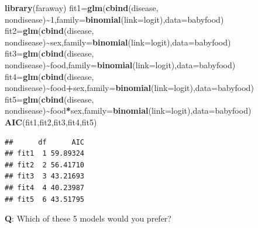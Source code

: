 \documentclass[
  ignorenonframetext,
]{beamer}
\newenvironment{Shaded}{\begin{snugshade}}{\end{snugshade}}
\newcommand{\AttributeTok}[1]{\textcolor[rgb]{0.13,0.29,0.53}{#1}}
\newcommand{\DecValTok}[1]{\textcolor[rgb]{0.00,0.00,0.81}{#1}}
\newcommand{\FunctionTok}[1]{\textcolor[rgb]{0.13,0.29,0.53}{\textbf{#1}}}
\newcommand{\NormalTok}[1]{#1}
\newcommand{\OtherTok}[1]{\textcolor[rgb]{0.56,0.35,0.01}{#1}}
\newcommand{\SpecialCharTok}[1]{\textcolor[rgb]{0.81,0.36,0.00}{\textbf{#1}}}
\begin{document}
\begin{frame}[fragile]
\footnotesize

\begin{Shaded}
\begin{Highlighting}[]
\FunctionTok{library}\NormalTok{(faraway)}
\NormalTok{fit1}\OtherTok{=}\FunctionTok{glm}\NormalTok{(}\FunctionTok{cbind}\NormalTok{(disease, nondisease)}\SpecialCharTok{\textasciitilde{}}\DecValTok{1}\NormalTok{,}\AttributeTok{family=}\FunctionTok{binomial}\NormalTok{(}\AttributeTok{link=}\NormalTok{logit),}\AttributeTok{data=}\NormalTok{babyfood)}
\NormalTok{fit2}\OtherTok{=}\FunctionTok{glm}\NormalTok{(}\FunctionTok{cbind}\NormalTok{(disease, nondisease)}\SpecialCharTok{\textasciitilde{}}\NormalTok{sex,}\AttributeTok{family=}\FunctionTok{binomial}\NormalTok{(}\AttributeTok{link=}\NormalTok{logit),}\AttributeTok{data=}\NormalTok{babyfood)}
\NormalTok{fit3}\OtherTok{=}\FunctionTok{glm}\NormalTok{(}\FunctionTok{cbind}\NormalTok{(disease, nondisease)}\SpecialCharTok{\textasciitilde{}}\NormalTok{food,}\AttributeTok{family=}\FunctionTok{binomial}\NormalTok{(}\AttributeTok{link=}\NormalTok{logit),}\AttributeTok{data=}\NormalTok{babyfood)}
\NormalTok{fit4}\OtherTok{=}\FunctionTok{glm}\NormalTok{(}\FunctionTok{cbind}\NormalTok{(disease, nondisease)}\SpecialCharTok{\textasciitilde{}}\NormalTok{food}\SpecialCharTok{+}\NormalTok{sex,}\AttributeTok{family=}\FunctionTok{binomial}\NormalTok{(}\AttributeTok{link=}\NormalTok{logit),}\AttributeTok{data=}\NormalTok{babyfood)}
\NormalTok{fit5}\OtherTok{=}\FunctionTok{glm}\NormalTok{(}\FunctionTok{cbind}\NormalTok{(disease, nondisease)}\SpecialCharTok{\textasciitilde{}}\NormalTok{food}\SpecialCharTok{*}\NormalTok{sex,}\AttributeTok{family=}\FunctionTok{binomial}\NormalTok{(}\AttributeTok{link=}\NormalTok{logit),}\AttributeTok{data=}\NormalTok{babyfood)}
\FunctionTok{AIC}\NormalTok{(fit1,fit2,fit3,fit4,fit5)}
\end{Highlighting}
\end{Shaded}

\begin{verbatim}
##      df      AIC
## fit1  1 59.89324
## fit2  2 56.41710
## fit3  3 43.21693
## fit4  4 40.23987
## fit5  6 43.51795
\end{verbatim}

\normalsize

\textbf{Q}: Which of these 5 models would you prefer?
\end{frame}
\end{document}
